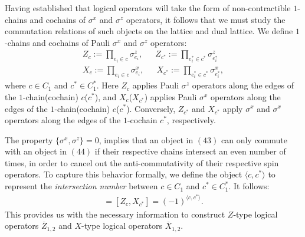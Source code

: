 \documentclass[12pt]{article}
\theoremstyle{definition}
\begin{document}
Having established that logical operators will take the form of non-contractible $1$-chains and cochains of $\sigma^x$ and $\sigma^z$ operators, it follows that we must study the commutation relations of such objects on the lattice and dual lattice. We define $1$-chains and cochains of Pauli $\sigma^x$ and $\sigma^z$ operators:
    \begin{align}
        Z_{c}:=\prod_{e_i\in c}\sigma^z_{e_i},\enspace\enspace\enspace Z_{c^*}:=\prod_{e^*_i\in c^*}\sigma^z_{e^*_i}\\
        X_c:=\prod_{e_i\in c}\sigma^x_{e_i},\enspace\enspace\enspace X_{c^*}:=\prod_{e^*_i\in c^*}\sigma^x_{e^*_i},
    \end{align}
where $c\in C_1$ and $c^*\in C_1^*$. Here $Z_{c}$ applies Pauli $\sigma^z$ operators along the edges of the $1$-chain(cochain) $c$($c^*$), and $X_{c}$($X_{c^*}$) applies Pauli $\sigma^x$ operators along the edges of the $1$-chain(cochain) $c$($c^*$). Conversely, $Z_{c^*}$ and $X_{c^*}$ apply $\sigma^x$ and $\sigma^x$ operators along the edges of the $1$-cochain $c^*$, respectively.\newline

The property $\{\sigma^x,\sigma^z\} = 0$, implies that an object in $(43)$ can only commute with an object in $(44)$ if their respective chains intersect an even number of times, in order to cancel out the anti-commutativity of their respective spin operators. To capture this behavior formally, we define the object $\langle c,c^*\rangle$ to represent the \emph{intersection number} between $c\in C_1$ and $c^*\in C^*_1$. It follows:
    \begin{align}
        [Z_{c^*},X_{c}] = [Z_{c},X_{c^*}] = (-1)^{\langle c,c^*\rangle}.
    \end{align}
This provides us with the necessary information to construct $Z$-type logical operators $\overline{Z}_{1,2}$ and $X$-type logical operators $\overline{X}_{1,2}$.\newline
\end{document}
